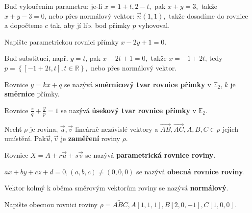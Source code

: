 \begin{reseni}
Buď vyloučením parametru: je-li $x=1+t, 2-t,$ pak $x+y=3,$ takže $x+y-3=0$, nebo
přes normálový vektor: $\vec n(1,1),$ takže dosadíme do rovnice a dopočteme $c$ tak,
aby jí lib. bod přímky $p$ vyhovoval.
\end{reseni}

\begin{priklad}
Napište parametrickou rovnici přímky $x-2y+1=0.$
\end{priklad}

\begin{reseni}
Buď substitucí, např. $y=t$, pak $x-2t+1=0,$ takže $x=-1+2t$, tedy $p=\left \{ [-1+2t,t], t \in \mathbb R \right \}, $
nebo přes normálový vektor.
\end{reseni}

\begin{definition}
    Rovnice $y=kx+q$ se nazývá \textbf{směrnicový tvar rovnice přímky} v $\mathbb E_2$,
    $k$ je \textbf{směrnice} přímky.
\end{definition}

\begin{definition}
Rovnice $\frac{x}{q}+\frac{y}{p}=1$ se nazývá \textbf{úsekový tvar rovnice přímky} v $\mathbb E_2$.
\end{definition}

\begin{definition}
Nechť $\rho$ je rovina, $\vec u, \vec v$ lineárně nezávislé vektory a $\overrightarrow{AB},
\overrightarrow{AC}, A,B,C\in \rho$ jejich umístění. Pak$\vec u, \vec v$ je
\textbf{zaměření} roviny $\rho.$
\end{definition}

\begin{definition}
    Rovnice $X=A+r\vec u+s\vec v$ se nazývá \textbf{parametrická rovnice roviny}.
\end{definition}

\begin{definition}
    $ax+by+cz+d=0, (a,b,c)\ne(0,0,0)$ se nazývá \textbf{obecná rovnice roviny}.
\end{definition}

\begin{definition}
    Vektor kolmý k oběma směrovým vektorům roviny se nazývá \textbf{normálový}.
\end{definition}

\begin{priklad}
Napište obecnou rovnici roviny $\rho = \overleftrightarrow{ABC}, A[1,1,1], B[2,0,-1], C[1,0,0].$
\end{priklad}

